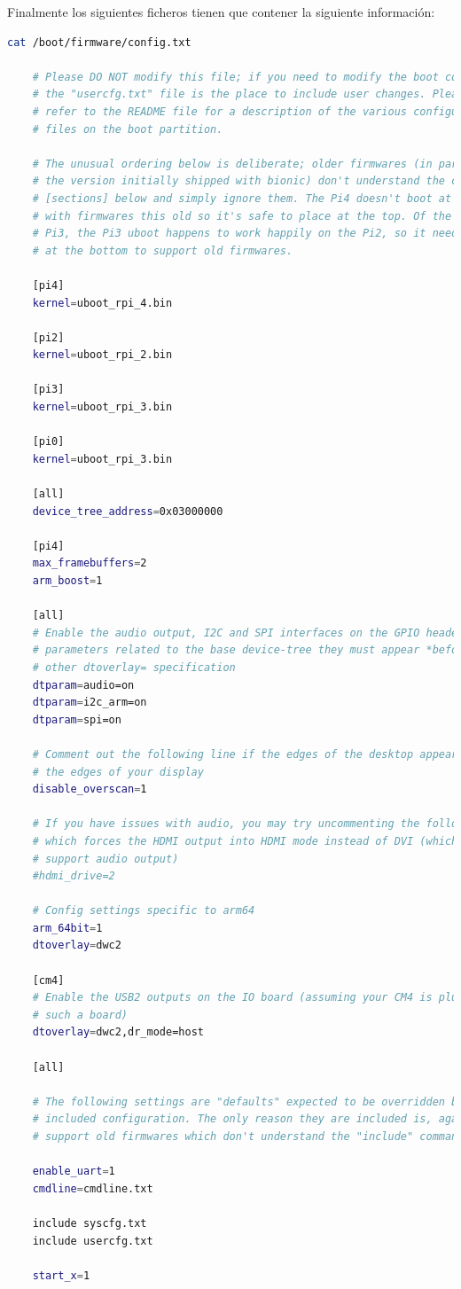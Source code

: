 Finalmente los siguientes ficheros tienen que contener la siguiente información: 

\begin{lstlisting}[language=bash]
	cat /boot/firmware/config.txt 
	
	# Please DO NOT modify this file; if you need to modify the boot config,
	# the "usercfg.txt" file is the place to include user changes. Please 
	# refer to the README file for a description of the various configuration 
	# files on the boot partition.
	
	# The unusual ordering below is deliberate; older firmwares (in particular 
	# the version initially shipped with bionic) don't understand the conditional
	# [sections] below and simply ignore them. The Pi4 doesn't boot at all 
	# with firmwares this old so it's safe to place at the top. Of the Pi2 and 
	# Pi3, the Pi3 uboot happens to work happily on the Pi2, so it needs to go 
	# at the bottom to support old firmwares.
	
	[pi4]
	kernel=uboot_rpi_4.bin
	
	[pi2]
	kernel=uboot_rpi_2.bin
	
	[pi3]
	kernel=uboot_rpi_3.bin
	
	[pi0]
	kernel=uboot_rpi_3.bin
	
	[all]
	device_tree_address=0x03000000
	
	[pi4]
	max_framebuffers=2
	arm_boost=1
	
	[all]
	# Enable the audio output, I2C and SPI interfaces on the GPIO header. As these
	# parameters related to the base device-tree they must appear *before* any
	# other dtoverlay= specification
	dtparam=audio=on
	dtparam=i2c_arm=on
	dtparam=spi=on
	
	# Comment out the following line if the edges of the desktop appear outside
	# the edges of your display
	disable_overscan=1
	
	# If you have issues with audio, you may try uncommenting the following line
	# which forces the HDMI output into HDMI mode instead of DVI (which doesn't
	# support audio output)
	#hdmi_drive=2
	
	# Config settings specific to arm64
	arm_64bit=1
	dtoverlay=dwc2
	
	[cm4]
	# Enable the USB2 outputs on the IO board (assuming your CM4 is plugged into
	# such a board)
	dtoverlay=dwc2,dr_mode=host
	
	[all]
	
	# The following settings are "defaults" expected to be overridden by the
	# included configuration. The only reason they are included is, again, to
	# support old firmwares which don't understand the "include" command.
	
	enable_uart=1
	cmdline=cmdline.txt
	
	include syscfg.txt
	include usercfg.txt
	
	start_x=1
\end{lstlisting}

